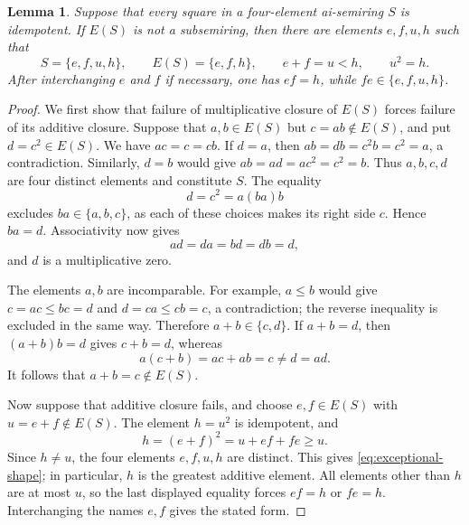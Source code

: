 \documentclass[11pt,reqno]{amsart}
\newtheorem{lemma}[theorem]{Lemma}
\theoremstyle{remark}
\numberwithin{equation}{section}
\begin{document}
\begin{lemma}\label{lem:idempotent-closure}
Suppose that every square in a four-element ai-semiring $S$ is
idempotent. If $E(S)$ is not a subsemiring, then there are elements
$e,f,u,h$ such that
\begin{equation}\label{eq:exceptional-shape}
S=\{e,f,u,h\},\qquad E(S)=\{e,f,h\},\qquad
 e+f=u<h,\qquad u^2=h.
\end{equation}
After interchanging $e$ and $f$ if necessary, one has $ef=h$, while
$fe\in\{e,f,u,h\}$.
\end{lemma}
\begin{proof}
We first show that failure of multiplicative closure of $E(S)$ forces
failure of its additive closure. Suppose that $a,b\in E(S)$ but
$c=ab\notin E(S)$, and put $d=c^2\in E(S)$. We have $ac=c=cb$.
If $d=a$, then $ab=db=c^2b=c^2=a$, a contradiction. Similarly,
$d=b$ would give $ab=ad=ac^2=c^2=b$. Thus $a,b,c,d$ are four distinct
elements and constitute $S$. The equality
\[
d=c^2=a(ba)b
\]
excludes $ba\in\{a,b,c\}$, as each of these choices makes its right
side $c$. Hence $ba=d$. Associativity now gives
\[
ad=da=bd=db=d,
\]
and $d$ is a multiplicative zero.

The elements $a,b$ are incomparable. For example, $a\leq b$ would give
$c=ac\leq bc=d$ and $d=ca\leq cb=c$, a contradiction; the reverse
inequality is excluded in the same way. Therefore $a+b\in\{c,d\}$.
If $a+b=d$, then $(a+b)b=d$ gives $c+b=d$, whereas
\[
a(c+b)=ac+ab=c\ne d=ad.
\]
It follows that $a+b=c\notin E(S)$.

Now suppose that additive closure fails, and choose $e,f\in E(S)$ with
$u=e+f\notin E(S)$. The element $h=u^2$ is idempotent, and
\[
h=(e+f)^2=u+ef+fe\geq u.
\]
Since $h\ne u$, the four elements $e,f,u,h$ are distinct. This gives
\eqref{eq:exceptional-shape}; in particular, $h$ is the greatest additive
element. All elements other than $h$ are at most $u$, so the last
displayed equality forces $ef=h$ or $fe=h$. Interchanging the names
$e,f$ gives the stated form.
\end{proof}
\end{document}

